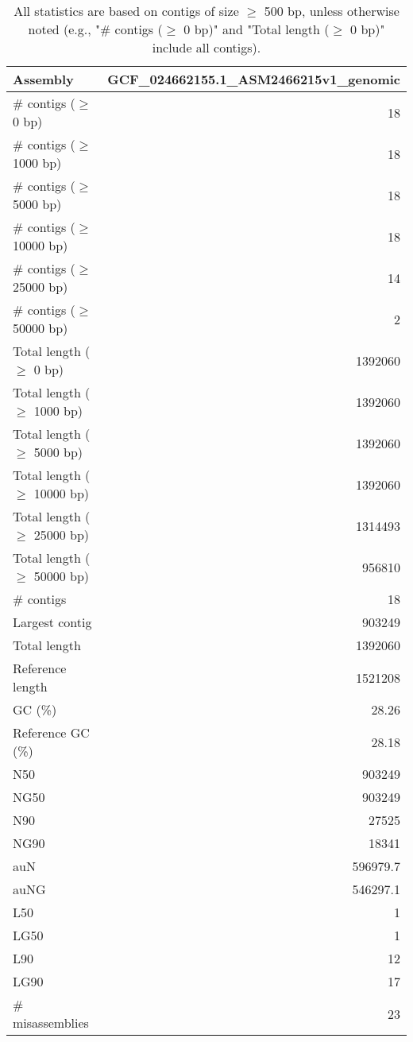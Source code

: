 \documentclass[12pt,a4paper]{article}
\begin{document}
\begin{table}[ht]
\begin{center}
\caption{All statistics are based on contigs of size $\geq$ 500 bp, unless otherwise noted (e.g., "\# contigs ($\geq$ 0 bp)" and "Total length ($\geq$ 0 bp)" include all contigs).}
\begin{tabular}{|l*{1}{|r}|}
\hline
Assembly & GCF\_024662155.1\_ASM2466215v1\_genomic \\ \hline
\# contigs ($\geq$ 0 bp) & 18 \\ \hline
\# contigs ($\geq$ 1000 bp) & 18 \\ \hline
\# contigs ($\geq$ 5000 bp) & 18 \\ \hline
\# contigs ($\geq$ 10000 bp) & 18 \\ \hline
\# contigs ($\geq$ 25000 bp) & 14 \\ \hline
\# contigs ($\geq$ 50000 bp) & 2 \\ \hline
Total length ($\geq$ 0 bp) & 1392060 \\ \hline
Total length ($\geq$ 1000 bp) & 1392060 \\ \hline
Total length ($\geq$ 5000 bp) & 1392060 \\ \hline
Total length ($\geq$ 10000 bp) & 1392060 \\ \hline
Total length ($\geq$ 25000 bp) & 1314493 \\ \hline
Total length ($\geq$ 50000 bp) & 956810 \\ \hline
\# contigs & 18 \\ \hline
Largest contig & 903249 \\ \hline
Total length & 1392060 \\ \hline
Reference length & 1521208 \\ \hline
GC (\%) & 28.26 \\ \hline
Reference GC (\%) & 28.18 \\ \hline
N50 & 903249 \\ \hline
NG50 & 903249 \\ \hline
N90 & 27525 \\ \hline
NG90 & 18341 \\ \hline
auN & 596979.7 \\ \hline
auNG & 546297.1 \\ \hline
L50 & 1 \\ \hline
LG50 & 1 \\ \hline
L90 & 12 \\ \hline
LG90 & 17 \\ \hline
\# misassemblies & 23 \\ \hline

\end{tabular}
\end{center}
\end{table}
\end{document}
